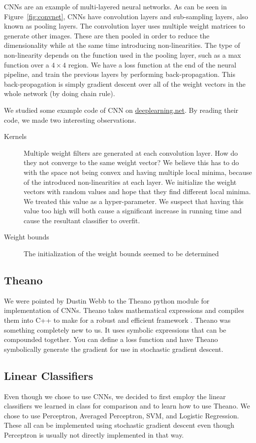 CNNs are an example of multi-layered neural networks.  As can be seen in Figure~\ref{fig:convnet}, CNNs have convolution layers and sub-sampling layers, also known as pooling layers.  The convolution layer uses multiple weight matrices to generate other images.  These are then pooled in order to reduce the dimensionality while at the same time introducing non-linearities.  The type of non-linearity depends on the function used in the pooling layer, such as a max function over a $4 \times 4$ region.  We have a loss function at the end of the neural pipeline, and train the previous layers by performing back-propagation.  This back-propagation is simply gradient descent over all of the weight vectors in the whole network (by doing chain rule).

We studied some example code of CNN on \url{deeplearning.net}.   By reading their code, we made two interesting observations.
\begin{description}
  \item[Kernels]
    Multiple weight filters are generated at each convolution layer.  How do they not converge to the same weight vector?  We believe this has to do with the space not being convex and having multiple local minima, because of the introduced non-linearities at each layer.  We initialize the weight vectors with random values and hope that they find different local minima.  We treated this value as a hyper-parameter.  We suspect that having this value too high will both cause a significant increase in running time and cause the resultant classifier to overfit.
  \item[Weight bounds]
    The initialization of the weight bounds seemed to be determined
\end{description}

\subsection{Theano}

We were pointed by Dustin Webb to the Theano python module for implementation of CNNs.  Theano takes mathematical expressions and compiles them into C++ to make for a robust and efficient framework \cite{bergstra+al:2010-scipy}.  Theano was something completely new to us.  It uses symbolic expressions that can be compounded together.  You can define a loss function and have Theano symbolically generate the gradient for use in stochastic gradient descent.

\subsection{Linear Classifiers}

Even though we chose to use CNNs, we decided to first employ the linear classifiers we learned in class for comparison and to learn how to use Theano.  We chose to use Perceptron, Averaged Perceptron, SVM, and Logistic Regression.  These all can be implemented using stochastic gradient descent even though Perceptron is usually not directly implemented in that way.
